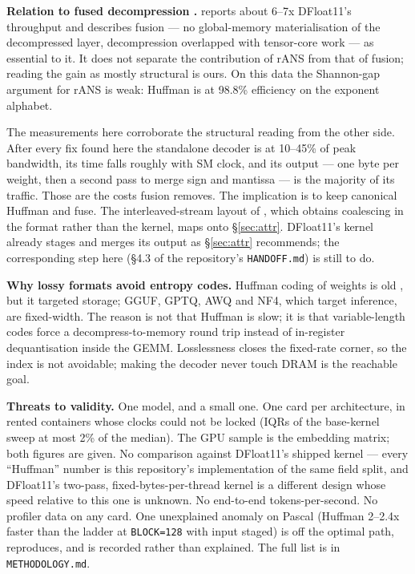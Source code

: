 \documentclass[11pt,a4paper]{article}
\newcommand{\code}[1]{\texttt{#1}}
\newcommand{\B}[1]{\textbf{#1}}
\begin{document}
\B{Relation to fused decompression \cite{shannon}.} \cite{shannon} reports about 6--7x DFloat11's throughput and describes fusion --- no global-memory materialisation of the decompressed layer, decompression overlapped with tensor-core work --- as essential to it. It does not separate the contribution of rANS from that of fusion; reading the gain as mostly structural is ours. On this data the Shannon-gap argument for rANS is weak: Huffman is at 98.8\% efficiency on the exponent alphabet.

The measurements here corroborate the structural reading from the other side. After every fix found here the standalone decoder is at 10--45\% of peak bandwidth, its time falls roughly with SM clock, and its output --- one byte per weight, then a second pass to merge sign and mantissa --- is the majority of its traffic. Those are the costs fusion removes. The implication is to keep canonical Huffman and fuse. The interleaved-stream layout of \cite{shannon}, which obtains coalescing in the format rather than the kernel, maps onto \S\ref{sec:attr}. DFloat11's kernel already stages and merges its output as \S\ref{sec:attr} recommends; the corresponding step here (\S4.3 of the repository's \code{HANDOFF.md}) is still to do.

\B{Why lossy formats avoid entropy codes.} Huffman coding of weights is old \cite{deepcompression}, but it targeted storage; GGUF, GPTQ, AWQ and NF4, which target inference, are fixed-width. The reason is not that Huffman is slow; it is that variable-length codes force a decompress-to-memory round trip instead of in-register dequantisation inside the GEMM. Losslessness closes the fixed-rate corner, so the index is not avoidable; making the decoder never touch DRAM is the reachable goal.

\B{Threats to validity.} One model, and a small one. One card per architecture, in rented containers whose clocks could not be locked (IQRs of the base-kernel sweep at most 2\% of the median). The GPU sample is the embedding matrix; both figures are given. No comparison against DFloat11's shipped kernel --- every ``Huffman'' number is this repository's implementation of the same field split, and DFloat11's two-pass, fixed-bytes-per-thread kernel is a different design whose speed relative to this one is unknown. No end-to-end tokens-per-second. No profiler data on any card. One unexplained anomaly on Pascal (Huffman 2--2.4x faster than the ladder at \code{BLOCK=128} with input staged) is off the optimal path, reproduces, and is recorded rather than explained. The full list is in \code{METHODOLOGY.md}.
\end{document}

